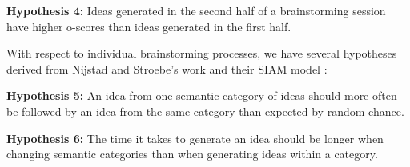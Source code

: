 \textbf{Hypothesis 4:} Ideas generated in the second half of a brainstorming session have higher o-scores than ideas generated in the first half.

With respect to individual brainstorming processes, we have several hypotheses derived from Nijstad and Stroebe's work and their SIAM model \cite{nijstad_how_2006}:

\textbf{Hypothesis 5:} An idea from one semantic category of ideas should more often be followed by an idea from the same category than expected by random chance.

\textbf{Hypothesis 6:} The time it takes to generate an idea should be longer when changing semantic categories than when generating ideas within a category.


